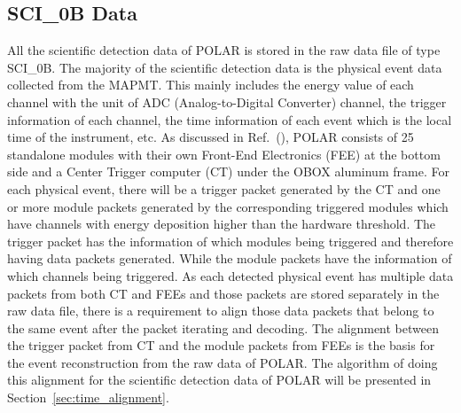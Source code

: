 \documentclass{raa}
\begin{document}
\subsection{SCI\_0B Data}
All the scientific detection data of POLAR is stored in the raw data file of type SCI\_0B. The majority of the scientific detection data is the physical event data collected from the MAPMT. This mainly includes the energy value of each channel with the unit of ADC (Analog-to-Digital Converter) channel, the trigger information of each channel, the time information of each event which is the local time of the instrument, etc. As discussed in Ref.~(\citealt{Produit2017}), POLAR consists of 25 standalone modules with their own Front-End Electronics (FEE) at the bottom side and a Center Trigger computer (CT) under the OBOX aluminum frame. For each physical event, there will be a trigger packet generated by the CT and one or more module packets generated by the corresponding triggered modules which have channels with energy deposition higher than the hardware threshold. The trigger packet has the information of which modules being triggered and therefore having data packets generated. While the module packets have the information of which channels being triggered. As each detected physical event has multiple data packets from both CT and FEEs and those packets are stored separately in the raw data file, there is a requirement to align those data packets that belong to the same event  after the packet iterating and decoding. The alignment between the trigger packet from CT and the module packets from FEEs is the basis for the event reconstruction from the raw data of POLAR. The algorithm of doing this alignment for the scientific detection data of POLAR will be presented in Section~\ref{sec:time_alignment}.
\end{document}
